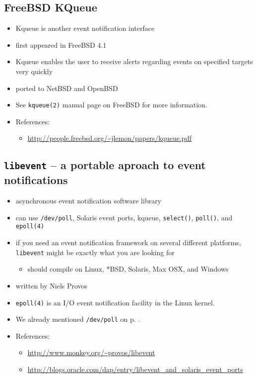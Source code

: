 \subsection{FreeBSD KQueue}

\begin{itemize}
\item Kqueue is another event notification interface
\item first appeared in FreeBSD 4.1
\item Kqueue enables the user to receive alerts regarding events on specified
targets very quickly
\item ported to NetBSD and OpenBSD
\end{itemize}


\begin{itemize}
\item See \texttt{kqueue(2)} manual page on FreeBSD for more information.
\item References:
	\begin{itemize}
	\item \url{http://people.freebsd.org/~jlemon/papers/kqueue.pdf}
	\end{itemize}
\end{itemize}

\subsection{\texttt{libevent} -- a portable aproach to event notifications}

\begin{itemize}
\item asynchronous event notification software library
\item can use \texttt{/dev/poll}, Solaris event ports, kqueue,
\texttt{select()}, \texttt{poll()}, and \texttt{epoll(4)}
\item if you need an event notification framework on several different
platforms, \texttt{libevent} might be exactly what you are looking for
	\begin{itemize}
	\item should compile on Linux, *BSD, Solaris, Max OSX, and Windows
	\end{itemize}
\item written by Niels Provos
\end{itemize}


\label{LIBEVENT}

\begin{itemize}
\item \texttt{epoll(4)} is an I/O event notification facility in the Linux
kernel.
\item We already mentioned \texttt{/dev/poll} on p. \pageref{DEV_POLL}.
\item References:
	\begin{itemize}
	\item \url{http://www.monkey.org/~provos/libevent}
	\item \url{http://blogs.oracle.com/dap/entry/libevent\_and\_solaris\_event\_ports}
	\end{itemize}
\end{itemize}

\endinput
